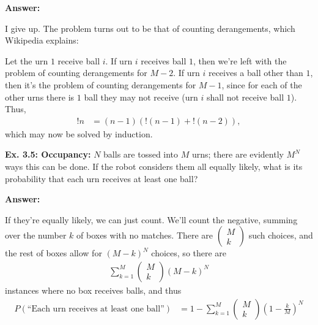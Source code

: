 \documentclass{article}
\begin{document}
\textbf{Answer:}

I give up. The problem turns out to be that of counting derangements, which Wikipedia explains:

Let the urn $1$ receive ball $i$. If urn $i$ receives ball $1$, then we're left with the problem of counting derangements for $M-2$.
If urn $i$ receives a ball other than $1$, then it's the problem of counting derangements for $M-1$, since for each of the other urns there is $1$ ball they may not receive (urn $i$ shall not receive ball $1$). Thus,
\begin{align}
	!n&=(n-1)(!(n-1)+!(n-2)),
\end{align}
which may now be solved by induction.

\textbf{Ex. 3.5: Occupancy: }$N$ balls are tossed into $M$ urns; there are evidently $M^N$ ways this can be done. If the robot considers them all equally likely, what is its probability that each urn receives at least one ball?

\textbf{Answer: }

If they're equally likely, we can just count. We'll count the negative, summing over the number $k$ of boxes with no matches. There are $\begin{pmatrix}M\\k\end{pmatrix}$ such choices, and the rest of boxes allow for $(M-k)^N$ choices, so there are
\begin{align}
	\sum_{k=1}^M\begin{pmatrix}M\\k\end{pmatrix}(M-k)^N
\end{align}
instances where no box receives balls, and thus
\begin{align}
	P(\text{``Each urn receives at least one ball''})&=1-\sum_{k=1}^M\begin{pmatrix}M\\k\end{pmatrix}\left(1-\frac{k}{M}\right)^N
\end{align}
\end{document}

